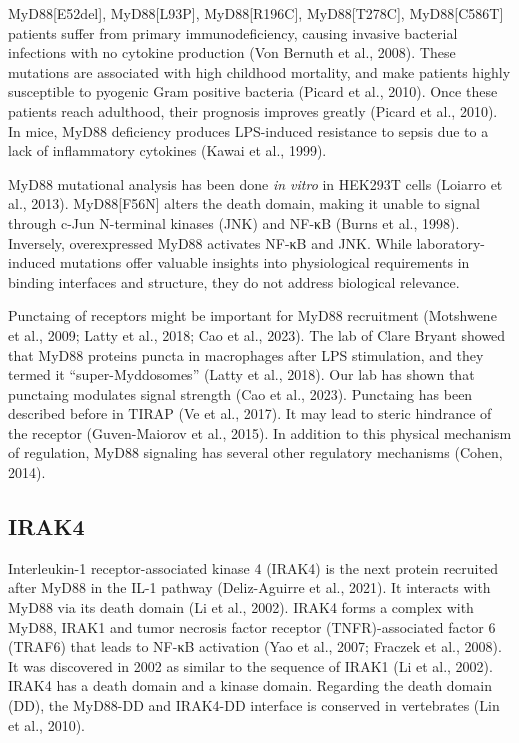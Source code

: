 MyD88[E52del], MyD88[L93P], MyD88[R196C], MyD88[T278C], MyD88[C586T] patients suffer from primary immunodeficiency, causing invasive bacterial infections with no cytokine production (Von Bernuth et al., 2008). These mutations are associated with high childhood mortality, and make patients highly susceptible to pyogenic Gram positive bacteria (Picard et al., 2010). Once these patients reach adulthood, their prognosis improves greatly (Picard et al., 2010). In mice, MyD88 deficiency produces LPS-induced resistance to sepsis due to a lack of inflammatory cytokines (Kawai et al., 1999). 

MyD88 mutational analysis has been done \emph{in vitro} in HEK293T cells (Loiarro et al., 2013). MyD88[F56N] alters the death domain, making it unable to signal through c-Jun N-terminal kinases (JNK) and NF-κB (Burns et al., 1998). Inversely, overexpressed MyD88 activates NF-κB and JNK. While laboratory-induced mutations offer valuable insights into physiological requirements in binding interfaces and structure, they do not address biological relevance.

Punctaing of receptors might be important for MyD88 recruitment (Motshwene et al., 2009; Latty et al., 2018; Cao et al., 2023). The lab of Clare Bryant showed that MyD88 proteins puncta in macrophages after LPS stimulation, and they termed it “super-Myddosomes” (Latty et al., 2018). Our lab has shown that punctaing modulates signal strength (Cao et al., 2023). Punctaing has been described before in TIRAP (Ve et al., 2017). It may lead to steric hindrance of the receptor (Guven-Maiorov et al., 2015). In addition to this physical mechanism of regulation, MyD88 signaling has several other regulatory mechanisms (Cohen, 2014).

\subsection{IRAK4}
\label{subsection:IRAK4}
Interleukin-1 receptor-associated kinase 4 (IRAK4) is the next protein recruited after MyD88 in the IL-1{\textbeta} pathway (Deliz-Aguirre et al., 2021). It interacts with MyD88 via its death domain (Li et al., 2002). IRAK4 forms a complex with MyD88, IRAK1 and tumor necrosis factor receptor (TNFR)-associated factor 6 (TRAF6) that leads to NF-κB activation (Yao et al., 2007; Fraczek et al., 2008). It was discovered in 2002 as similar to the sequence of IRAK1 (Li et al., 2002). IRAK4 has a death domain and a kinase domain. Regarding the death domain (DD), the MyD88-DD and IRAK4-DD interface is conserved in vertebrates (Lin et al., 2010).


